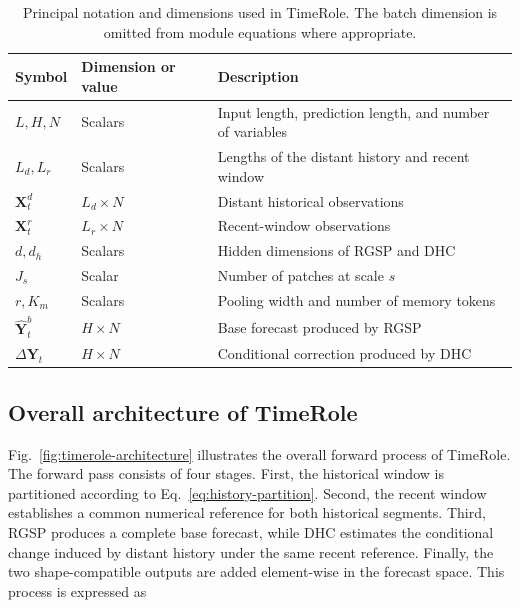 \begin{table}[H]
\tablecaptionfont
\caption{Principal notation and dimensions used in TimeRole. The batch dimension is omitted from module equations where appropriate.}
\label{tab:method-notation}
\centering
\tablebodyfont
\setlength{\tabcolsep}{3pt}
\renewcommand{\arraystretch}{1.05}
\begin{tabular}{@{}>{\raggedright\arraybackslash}p{}
>{\raggedright\arraybackslash}p{}
>{\raggedright\arraybackslash}p{}@{}}
\toprule
Symbol & Dimension or value & Description \\
\midrule
\(L,H,N\) & Scalars & Input length, prediction length, and number of variables \\
\(L_d,L_r\) & Scalars & Lengths of the distant history and recent window \\
\(\mathbf X_t^d\) & \(L_d\times N\) & Distant historical observations \\
\(\mathbf X_t^r\) & \(L_r\times N\) & Recent-window observations \\
\(d,d_h\) & Scalars & Hidden dimensions of RGSP and DHC \\
\(J_s\) & Scalar & Number of patches at scale \(s\) \\
\(r,K_m\) & Scalars & Pooling width and number of memory tokens \\
\(\widehat{\mathbf Y}_t^b\) & \(H\times N\) & Base forecast produced by RGSP \\
\(\Delta\mathbf Y_t\) & \(H\times N\) & Conditional correction produced by DHC \\
\bottomrule
\end{tabular}
\end{table}

\subsection{Overall architecture of TimeRole}

Fig.~\ref{fig:timerole-architecture} illustrates the overall forward process of TimeRole. The forward pass consists of four stages. First, the historical window is partitioned according to Eq.~\eqref{eq:history-partition}. Second, the recent window establishes a common numerical reference for both historical segments. Third, RGSP produces a complete base forecast, while DHC estimates the conditional change induced by distant history under the same recent reference. Finally, the two shape-compatible outputs are added element-wise in the forecast space. This process is expressed as

